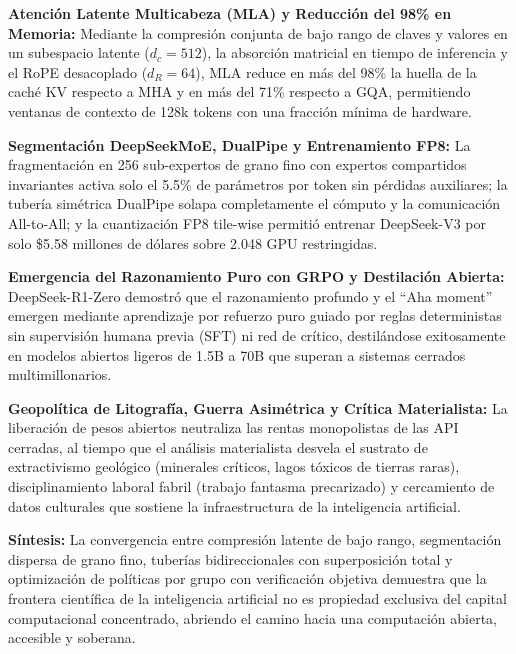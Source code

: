 \begin{resumenlist}[topsep=0.08cm, itemsep=0.08cm, parsep=0pt]
    \item \textbf{Atención Latente Multicabeza (MLA) y Reducción del 98\% en Memoria:} Mediante la compresión conjunta de bajo rango de claves y valores en un subespacio latente ($d_c = 512$), la absorción matricial en tiempo de inferencia y el RoPE desacoplado ($d_R = 64$), MLA reduce en más del 98\% la huella de la caché KV respecto a MHA y en más del 71\% respecto a GQA, permitiendo ventanas de contexto de 128k tokens con una fracción mínima de hardware.
    \item \textbf{Segmentación DeepSeekMoE, DualPipe y Entrenamiento FP8:} La fragmentación en 256 sub-expertos de grano fino con expertos compartidos invariantes activa solo el 5.5\% de parámetros por token sin pérdidas auxiliares; la tubería simétrica DualPipe solapa completamente el cómputo y la comunicación All-to-All; y la cuantización FP8 tile-wise permitió entrenar DeepSeek-V3 por solo \$5.58 millones de dólares sobre 2.048 GPU restringidas.
    \item \textbf{Emergencia del Razonamiento Puro con GRPO y Destilación Abierta:} DeepSeek-R1-Zero demostró que el razonamiento profundo y el ``Aha moment'' emergen mediante aprendizaje por refuerzo puro guiado por reglas deterministas sin supervisión humana previa (SFT) ni red de crítico, destilándose exitosamente en modelos abiertos ligeros de 1.5B a 70B que superan a sistemas cerrados multimillonarios.
    \item \textbf{Geopolítica de Litografía, Guerra Asimétrica y Crítica Materialista:} La liberación de pesos abiertos neutraliza las rentas monopolistas de las API cerradas, al tiempo que el análisis materialista desvela el sustrato de extractivismo geológico (minerales críticos, lagos tóxicos de tierras raras), disciplinamiento laboral fabril (trabajo fantasma precarizado) y cercamiento de datos culturales que sostiene la infraestructura de la inteligencia artificial.
\end{resumenlist}

\vspace{0.3cm}
\begin{cajabeige}
\textbf{Síntesis:} La convergencia entre compresión latente de bajo rango, segmentación dispersa de grano fino, tuberías bidireccionales con superposición total y optimización de políticas por grupo con verificación objetiva demuestra que la frontera científica de la inteligencia artificial no es propiedad exclusiva del capital computacional concentrado, abriendo el camino hacia una computación abierta, accesible y soberana.
\end{cajabeige}

